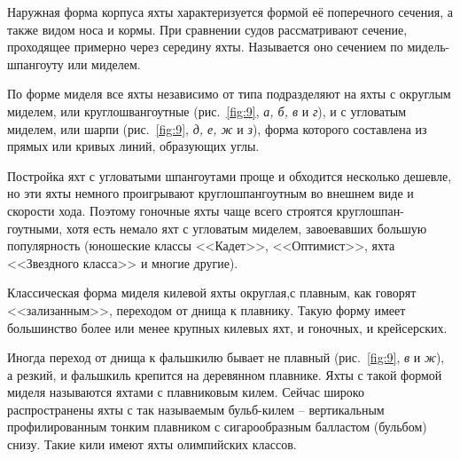\documentclass[a4paper, 12pt, twoside, final]{scrbook}
\begin{document}
Наружная форма корпуса яхты характеризуется формой её поперечного
сечения, а также видом носа и кормы. При сравнении судов рассматривают
сечение, проходящее примерно через середину яхты. Называется оно сечением
по мидель-шпангоуту или миделем. 

По форме миделя все яхты независимо от типа подразделяют на яхты с
округлым миделем, или круглошвангоутные (рис.~\ref{fig:9},
\emph{а, б, в} и \emph{г}), и с угловатым миделем, или шарпи (рис.~\ref{fig:9},
\emph{д, е, ж} и \emph{з}), форма которого составлена из прямых или
кривых линий, образующих углы.

Постройка яхт с угловатыми шпангоутами проще и обходится несколько
дешевле, но эти яхты немного проигрывают круглошпангоутным во внешнем
виде и скорости хода. Поэтому гоночные яхты чаще всего строятся круглошпан-гоутными,
хотя есть немало яхт с угловатым миделем, завоевавших большую популярность
(юношеские классы <<Кадет>>, <<Оптимист>>, яхта <<Звездного класса>> и многие
другие).

Классическая форма миделя килевой яхты округлая,с плавным, как говорят
<<зализанным>>, переходом от днища к плавнику. Такую форму имеет большинство
более или менее крупных килевых яхт, и гоночных, и крейсерских.

Иногда переход от днища к фальшкилю бывает не плавный (рис.~\ref{fig:9},
\emph{в} и \emph{ж}), а резкий, и фальшкиль крепится на деревянном
плавнике. Яхты с такой формой миделя называются яхтами с плавниковым
килем. Сейчас широко распространены яхты с так называемым бульб-килем \--- вертикальным профилированным тонким плавником с сигарообразным балластом
(бульбом) снизу. Такие кили имеют яхты олимпийских классов.
\end{document}
